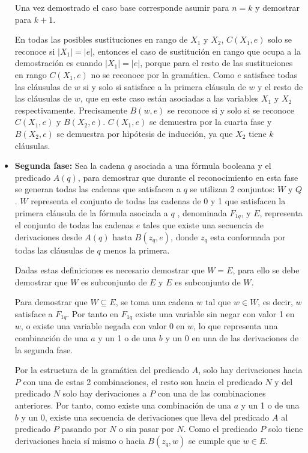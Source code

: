\documentclass[12pt]{article}
\begin{document}
\begin{itemize}
          Una vez demostrado el caso base corresponde asumir para $n=k$ y demostrar para $k+1$.

          En todas las posibles sustituciones en rango de $X_1$ y $X_2$, $C(X_1,e)$ solo se reconoce si $|X_1|=|e|$, entonces el caso de sustitución en rango que ocupa a la demostración
          es cuando $|X_1|=|e|$, porque para el resto de las sustituciones en rango $C(X_1,e)$ no se reconoce por la gramática.
          Como $e$ satisface todas las cláusulas de $w$ si y solo si satisface a la primera cláusula de $w$ y el resto de las cláusulas de $w$, que en este caso
          están asociadas a las variables $X_1$ y $X_2$ respectivamente. Precisamente $B(w,e)$ se reconoce si y solo si se reconoce $C(X_1,e)$ y $B(X_2,e)$. $C(X_1,e)$ se demuestra por la cuarta fase y $B(X_2,e)$ se demuestra por hipótesis de inducción, ya que $X_2$ tiene $k$ cláusulas.

    \item \textbf{Segunda fase:} Sea la cadena $q$ asociada a una fórmula booleana y el predicado $A(q)$, para
          demostrar que durante el reconocimiento en esta fase se generan todas las cadenas que satisfacen a $q$ se
          utilizan 2 conjuntos: $W$ y $Q$. $W$ representa el conjunto de todas las cadenas de 0 y 1 que satisfacen la
          primera cláusula de la fórmula asociada a $q$ , denominada $F_{1q}$, y $E$, representa el conjunto de todas
          las cadenas $e$ tales que existe una secuencia de derivaciones desde $A(q)$ hasta $B(z_q,e)$, donde $z_q$
          esta conformada por todas las cláusulas de $q$ menos la primera.

          Dadas estas definiciones es necesario demostrar que $W=E$, para ello se debe demostrar que $W$ es subconjunto de $E$ y $E$ es subconjunto de $W$.

          Para demostrar que $W\subseteq E$, se toma una cadena $w$ tal que $w\in W$, es decir, $w$ satisface a $F_{1q}$. Por tanto en $F_{1q}$ existe una variable sin negar con valor 1 en $w$, o existe una variable negada con valor 0 en $w$, lo que representa una combinación de una $a$ y un 1 o de una $b$ y un 0 en una de las derivaciones de la segunda fase.

          Por la estructura de la gramática del predicado $A$, solo hay derivaciones hacia $P$ con una de estas 2 combinaciones, el resto son hacia el predicado $N$ y del predicado $N$ solo hay derivaciones a $P$ con una de las combinaciones anteriores. Por tanto, como existe una combinación de una $a$ y un 1 o de una $b$ y un 0, existe una secuencia de derivaciones que lleva del predicado $A$ al predicado $P$ pasando por $N$ o sin pasar por $N$. Como el predicado $P$ solo tiene derivaciones hacia sí mismo o hacia $B(z_q,w)$ se cumple que $w\in E$.


\end{itemize}
\end{document}
